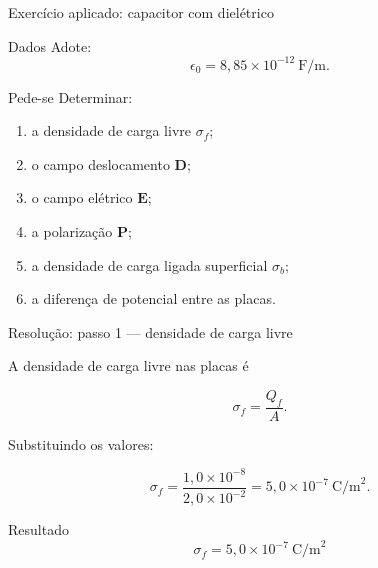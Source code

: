 \documentclass[aspectratio=169]{beamer}
\begin{document}
\begin{frame}{Exercício aplicado: capacitor com dielétrico}

\begin{block}{Dados}
Adote:
\[
\epsilon_0 = 8{,}85\times 10^{-12}\ \text{F/m}.
\]
\end{block}

\begin{alertblock}{Pede-se}
Determinar:
\begin{enumerate}
\item a densidade de carga livre \(\sigma_f\);
\item o campo deslocamento \(\mathbf D\);
\item o campo elétrico \(\mathbf E\);
\item a polarização \(\mathbf P\);
\item a densidade de carga ligada superficial \(\sigma_b\);
\item a diferença de potencial entre as placas.
\end{enumerate}
\end{alertblock}

\end{frame}


\begin{frame}{Resolução: passo 1 --- densidade de carga livre}

A densidade de carga livre nas placas é

\begin{equation}
\sigma_f = \frac{Q_f}{A}.
\end{equation}

Substituindo os valores:

\begin{equation}
\sigma_f
=
\frac{1,0\times 10^{-8}}{2,0\times 10^{-2}}
=
5,0\times 10^{-7}\ \text{C/m}^2.
\end{equation}

\begin{alertblock}{Resultado}
\begin{equation}
\sigma_f = 5,0\times 10^{-7}\ \text{C/m}^2
\end{equation}
\end{alertblock}

\end{frame}

\end{document}
